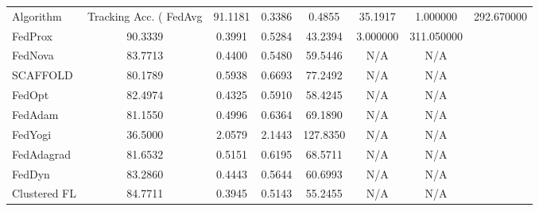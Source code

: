\begin{tabular}{lcccccc}
\toprule
Algorithm & Tracking Acc. (%
\midrule
FedAvg & 91.1181 & 0.3386 & 0.4855 & 35.1917 & 1.000000 & 292.670000 \\
FedProx & 90.3339 & 0.3991 & 0.5284 & 43.2394 & 3.000000 & 311.050000 \\
FedNova & 83.7713 & 0.4400 & 0.5480 & 59.5446 & N/A & N/A \\
SCAFFOLD & 80.1789 & 0.5938 & 0.6693 & 77.2492 & N/A & N/A \\
FedOpt & 82.4974 & 0.4325 & 0.5910 & 58.4245 & N/A & N/A \\
FedAdam & 81.1550 & 0.4996 & 0.6364 & 69.1890 & N/A & N/A \\
FedYogi & 36.5000 & 2.0579 & 2.1443 & 127.8350 & N/A & N/A \\
FedAdagrad & 81.6532 & 0.5151 & 0.6195 & 68.5711 & N/A & N/A \\
FedDyn & 83.2860 & 0.4443 & 0.5644 & 60.6993 & N/A & N/A \\
Clustered FL & 84.7711 & 0.3945 & 0.5143 & 55.2455 & N/A & N/A \\
\bottomrule
\end{tabular}
